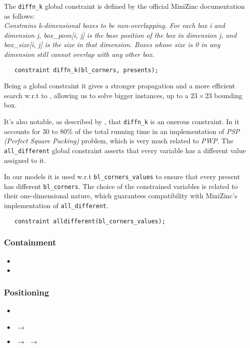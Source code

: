 \documentclass[a4paper,10pt]{article}
\newcommand{\xmark}{\ding{55}}%
\newcounter{subsubsubsection}[subsubsection]
\begin{document}
 \label{sec:diffnk}
The \texttt{diffn\_k} global constraint is defined by the official MiniZinc documentation \cite{minizinc} as follows: \\
\emph{Constrains k-dimensional boxes to be non-overlapping. For each box i and dimension j, box\_posn[i, j] is the base position of the box in dimension j, and box\_size[i, j] is the size in that dimension. Boxes whose size is 0 in any dimension still cannot overlap with any other box.}
\begin{verbatim}
   constraint diffn_k(bl_corners, presents);
\end{verbatim}
Being a global constraint it gives a stronger propagation and a more efficient search w.r.t to , allowing us to solve bigger instances, up to a $23 \times 23$ bounding box.

It's also notable, as described by \cite{sweep}, that \texttt{diffn\_k} is an onerous constraint. In \cite{sweep} it accounts for 30 to 80\% of the total running time in an implementation of \emph{PSP (Perfect Square Packing)} problem, which is very much related to \emph{PWP}.
 \label{sec:different-bl-corners}
The \texttt{all\_different} global constraint asserts that every variable has a different value assigned to it.

In our models it is used w.r.t \texttt{bl\_corners\_values} to ensure that every present has different \texttt{bl\_corners}. The choice of the constrained variables is related to their one-dimensional nature, which guarantees compatibility with MiniZinc's implementation of \texttt{all\_different}.
\begin{verbatim}
   constraint alldifferent(bl_corners_values);
\end{verbatim}
\subsubsection{Containment}
\begin{itemize}
   \item {}
   \item {}
\end{itemize}

 \label{sec:reduce-presents-domains}
 \label{sec:areas-summation}

\subsubsection{Positioning}
\begin{itemize}
   \item {}
   \item {} $\rightarrow$ \xmark
   \item {} $\rightarrow$ $\rightarrow$ \xmark
\end{itemize}
\end{document}
